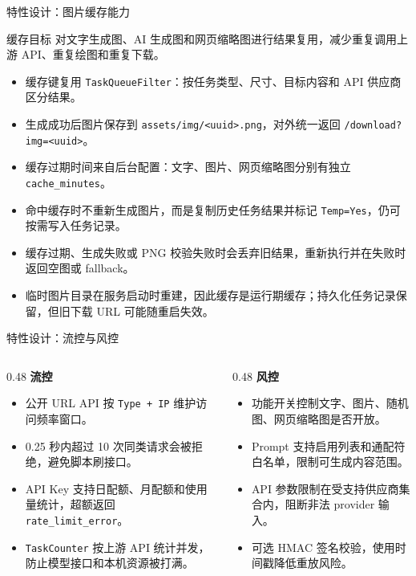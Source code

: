 \documentclass[aspectratio=169,UTF8]{ctexbeamer}
\newcommand{\code}[1]{\texttt{#1}}
\begin{document}
\begin{frame}{特性设计：图片缓存能力}
  \begin{block}{缓存目标}
    对文字生成图、AI 生成图和网页缩略图进行结果复用，减少重复调用上游 API、重复绘图和重复下载。
  \end{block}

  \begin{itemize}
    \item 缓存键复用 \code{TaskQueueFilter}：按任务类型、尺寸、目标内容和 API 供应商区分结果。
    \item 生成成功后图片保存到 \code{assets/img/<uuid>.png}，对外统一返回 \code{/download?img=<uuid>}。
    \item 缓存过期时间来自后台配置：文字、图片、网页缩略图分别有独立 \code{cache\_minutes}。
    \item 命中缓存时不重新生成图片，而是复制历史任务结果并标记 \code{Temp=Yes}，仍可按需写入任务记录。
    \item 缓存过期、生成失败或 PNG 校验失败时会丢弃旧结果，重新执行并在失败时返回空图或 fallback。
    \item 临时图片目录在服务启动时重建，因此缓存是运行期缓存；持久化任务记录保留，但旧下载 URL 可能随重启失效。
  \end{itemize}
\end{frame}

\begin{frame}{特性设计：流控与风控}
  \begin{columns}[T]
    \begin{column}{0.48\linewidth}
      \textbf{流控}
      \begin{itemize}
        \item 公开 URL API 按 \code{Type + IP} 维护访问频率窗口。
        \item 0.25 秒内超过 10 次同类请求会被拒绝，避免脚本刷接口。
        \item API Key 支持日配额、月配额和使用量统计，超额返回 \code{rate\_limit\_error}。
        \item \code{TaskCounter} 按上游 API 统计并发，防止模型接口和本机资源被打满。
      \end{itemize}
    \end{column}
    \begin{column}{0.48\linewidth}
      \textbf{风控}
      \begin{itemize}
        \item 功能开关控制文字、图片、随机图、网页缩略图是否开放。
        \item Prompt 支持启用列表和通配符白名单，限制可生成内容范围。
        \item API 参数限制在受支持供应商集合内，阻断非法 provider 输入。
        \item 可选 HMAC 签名校验，使用时间戳降低重放风险。
      \end{itemize}
    \end{column}
  \end{columns}
\end{frame}
\end{document}
